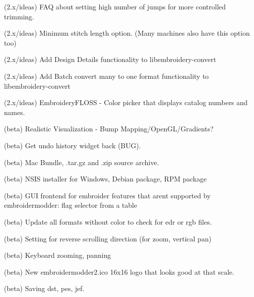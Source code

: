\begin{DoxyRefList}
\label{todo__todo000346}%
%
(2.\+x/ideas) FAQ about setting high number of jumps for more controlled trimming.

\label{todo__todo000347}%
%
(2.\+x/ideas) Minimum stitch length option. (Many machines also have this option too)

\label{todo__todo000348}%
%
(2.\+x/ideas) Add \textquotesingle{}Design Details\textquotesingle{} functionality to libembroidery-\/convert

\label{todo__todo000349}%
%
(2.\+x/ideas) Add \textquotesingle{}Batch convert many to one format\textquotesingle{} functionality to libembroidery-\/convert

\label{todo__todo000350}%
%
(2.\+x/ideas) Embroidery\+FLOSS -\/ Color picker that displays catalog numbers and names.

\label{todo__todo000351}%
%
(beta) Realistic Visualization -\/ Bump Mapping/\+Open\+GL/\+Gradients?

\label{todo__todo000352}%
%
(beta) Get undo history widget back (BUG).

\label{todo__todo000353}%
%
(beta) Mac Bundle, .tar.\+gz and .zip source archive.

\label{todo__todo000354}%
%
(beta) NSIS installer for Windows, Debian package, RPM package

\label{todo__todo000355}%
%
(beta) GUI frontend for embroider features that aren\textquotesingle{}t supported by embroidermodder\+: flag selector from a table

\label{todo__todo000356}%
%
(beta) Update all formats without color to check for edr or rgb files.

\label{todo__todo000357}%
%
(beta) Setting for reverse scrolling direction (for zoom, vertical pan)

\label{todo__todo000358}%
%
(beta) Keyboard zooming, panning

\label{todo__todo000359}%
%
(beta) New embroidermodder2.\+ico 16x16 logo that looks good at that scale.

\label{todo__todo000360}%
%
(beta) Saving dst, pes, jef.


\end{DoxyRefList}
